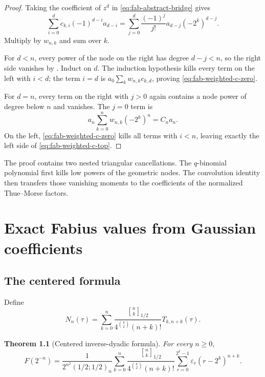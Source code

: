 \documentclass[11pt,oneside,openany]{book}
\newtheorem{theorem}{Theorem}[chapter]
\theoremstyle{definition}
\theoremstyle{remark}
\newcommand{\Qbinom}[3]{\genfrac{[}{]}{0pt}{}{#1}{#2}_{#3}}
\begin{document}
\begin{proof}
Taking the coefficient of $z^d$ in \eqref{eq:fab-abstract-bridge} gives
\begin{equation}
 \sum_{i=0}^dc_{k,i}(-1)^{d-i}a_{d-i}
 =\sum_{j=0}^d\frac{(-1)^j}{j!}a_{d-j}(-2^k)^{d-j}.
 \label{eq:fab-coeff-identity}
\end{equation}
Multiply by $w_{n,k}$ and sum over $k$.

For $d<n$, every power of the node on the right has degree $d-j<n$, so the right side vanishes by .  Induct on $d$.  The induction hypothesis kills every term on the left with $i<d$; the term $i=d$ is
\(
 a_0\sum_kw_{n,k}c_{k,d}
\), proving \eqref{eq:fab-weighted-c-zero}.

For $d=n$, every term on the right with $j>0$ again contains a node power of degree below $n$ and vanishes.  The $j=0$ term is
\[
 a_n\sum_{k=0}^nw_{n,k}(-2^k)^n=C_na_n.
\]
On the left, \eqref{eq:fab-weighted-c-zero} kills all terms with $i<n$, leaving exactly the left side of \eqref{eq:fab-weighted-c-top}.
\end{proof}

The proof contains two nested triangular cancellations.  The $q$-binomial polynomial first kills low powers of the geometric nodes.  The convolution identity then transfers those vanishing moments to the coefficients of the normalized Thue--Morse factors.

\chapter{Exact Fabius values from Gaussian coefficients}\label{chap:fabius-exact}

\section{The centered formula}

Define
\begin{equation}
 N_n(\tau)=\sum_{k=0}^n
 \frac{\Qbinom nk{1/2}}{4^{\binom k2}(n+k)!}
 T_{k,n+k}(\tau).
 \label{eq:fab-Nn}
\end{equation}

\begin{theorem}[Centered inverse-dyadic formula]\label{thm:fab-centered}
For every $n\ge0$,
\begin{equation}
 \boxed{
 F(2^{-n})=
 \frac1{2^{n^2}(1/2;1/2)_n}
 \sum_{k=0}^n
 \frac{\Qbinom nk{1/2}}{4^{\binom k2}(n+k)!}
 \sum_{r=0}^{2^k-1}\varepsilon_r(r-2^k)^{n+k}.}
 \label{eq:fab-centered-formula}
\end{equation}
\end{theorem}
\end{document}

